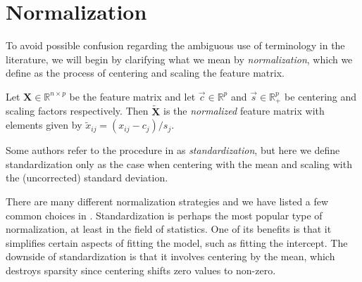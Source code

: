 \section{Normalization}
To avoid possible confusion regarding the ambiguous use of terminology in the literature,
we will begin by clarifying what we mean by \emph{normalization}, which we define as the
process of centering and scaling the feature matrix.

\begin{definition}[Normalization]
  \label{def:normalization}
  Let \(\bm{X} \in \mathbb{R}^{n\times p}\) be the feature matrix and let
  \(\vec{c} \in \mathbb{R}^p\) and \(\vec{s} \in \mathbb{R}^p_+\) be centering
  and scaling factors respectively. Then \(\tilde{\bm{X}}\) is the
  \emph{normalized} feature matrix with elements given by
  \(\tilde{x}_{ij} = (x_{ij} - c_j)/s_j\).
\end{definition}

Some authors refer to the procedure in  as \emph{standardization},
but here we define standardization only as the case when centering with the mean and
scaling with the (uncorrected) standard deviation.

There are many different normalization strategies and we have listed a few common choices
in . Standardization is perhaps the most popular type of
normalization, at least in the field of statistics. One of its benefits is that it
simplifies certain aspects of fitting the model, such as fitting the intercept. The
downside of standardization is that it involves centering by the mean, which destroys
sparsity since centering shifts zero values to non-zero.

